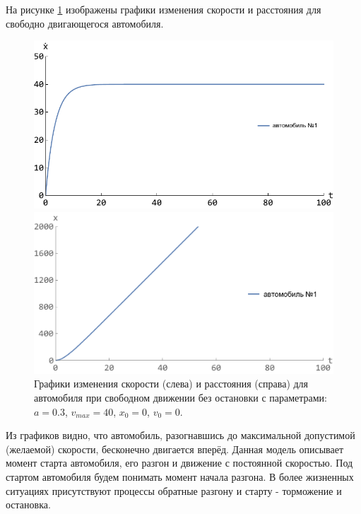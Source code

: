 \documentclass[12pt, a4paper]{extarticle}
\numberwithin{equation}{section}
\numberwithin{figure}{section}
\begin{document}
На рисунке \ref{free_drive_without_stop} изображены графики изменения скорости и расстояния для свободно двигающегося автомобиля.
\begin{figure}[h!]
	\begin{center}
		\begin{minipage}[h!]{0.48\linewidth}
			\includegraphics[width=1\linewidth,height=0.2\textheight]
			{Images/free_drive_speed.pdf}
		\end{minipage}
		\hfill 
		\begin{minipage}[h!]{0.48\linewidth}
			\includegraphics[width=1\linewidth,height=0.2\textheight]
			{Images/free_drive_distance.pdf}
		\end{minipage}
		\caption{Графики изменения скорости (слева) и расстояния (справа) для автомобиля при свободном движении без остановки с параметрами: $a=0.3$, $v_{max}=40$, $x_0=0$, $v_0=0$.}
		\label{free_drive_without_stop}
	\end{center}
\end{figure}

Из графиков видно, что автомобиль, разогнавшись до максимальной допустимой (желаемой) скорости, бесконечно двигается вперёд. Данная модель описывает момент старта автомобиля, его разгон и движение с постоянной скоростью. Под стартом автомобиля будем понимать момент начала разгона. В более жизненных ситуациях присутствуют процессы обратные разгону и старту - торможение и остановка.
\end{document}

